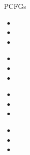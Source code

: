 \documentclass[xcolor=pdftex,x11names,table,hyperref]{beamer}
\begin{document}
\begin{frame}{PCFGs}
\begin{itemize}
	\item 
	\item 
	\item 
\end{itemize}
\end{frame}


\begin{frame}{}
\begin{itemize}
	\item 
	\item 
	\item 
\end{itemize}
\end{frame}




\begin{frame}{}
\begin{itemize}
	\item 
	\item 
	\item 
\end{itemize}
\end{frame}



\begin{frame}{}
\begin{itemize}
	\item 
	\item 
	\item 
\end{itemize}
\end{frame}




\end{document}
